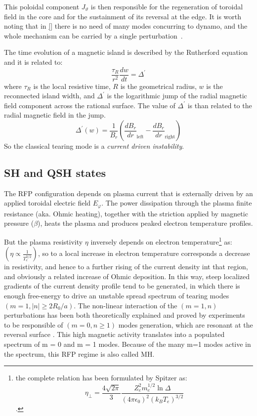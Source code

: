 This poloidal component $J_\vartheta$ is then responsible for the regeneration of toroidal field in the core and for the sustainment of its reversal at the edge. It is worth noting that in \eqref{} there is no need of many modes concurring to dynamo, and the whole mechanism can be carried by a single perturbation~\cite{Bonomo39}.


The time evolution of a magnetic island is described by the Rutherford equation and it is related to:
\begin{equation}
    \frac{\tau_R}{r^2} \frac{dw}{dt} = \Delta^\prime
\end{equation}
%
where $\tau_R$ is the local resistive time, $R$ is the geometrical radius, $w$ is the reconnected island width, and $\Delta^\prime$ is the logarithmic jump of the radial magnetic field component across the rational surface.
%
The value of $\Delta^\prime$ is than related to the radial magnetic field in the jump.
\begin{equation}
    \Delta^\prime (w) = \frac{1}{B_r} \left( \frac{dB_r}{dr}_\text{left} - \frac{dB_r}{dr}_\text{right} \right)
\end{equation}
%	
So the classical tearing mode is a {\em current driven instability}.

\subsection{SH and QSH states}

The RFP configuration depends on plasma current that is externally driven by an applied toroidal electric field $E_\varphi$. The
power dissipation through the plasma finite resistance (aka. Ohmic heating), together with the striction applied by magnetic pressure ($\beta$), heats the plasma and produces peaked electron temperature profiles. 

But the plasma resistivity $\eta$ inversely depends on electron temperature\footnote{the complete relation has been formulated by Spitzer as: $$\eta_\bot  = \frac{4\sqrt{2\pi}}{3} \frac{Z_e^2 m_e^{1/2} \ln{\Delta}}{(4\pi\epsilon_0)^2(k_B T_e)^{3/2}} $$.}
as: $(\eta \propto \frac{1}{T_e^{3/2}})$, so to a local increase in electron temperature corresponds a decrease in resistivity, and hence to a further rising of the current density int that region, and obviously a related increase of Ohmic deposition. In this way, steep localized gradients of the current density profile tend to be generated, in which there is enough free-energy to drive an unstable spread spectrum of tearing modes $(m = 1, |n| \geq 2R_0 /a)$. The non-linear interaction of the $(m = 1, n)$ perturbations has been both theoretically explained and proved by experiments to be responsible of $(m = 0, n \geq 1)$ modes generation, which are resonant at the reversal surface \cite{Bonomo33}. This high magnetic activity translates into a populated spectrum of m = 0 and m = 1 modes.
Because of the many m=1 modes active in the spectrum, this RFP regime is also called \acl{MH}.

